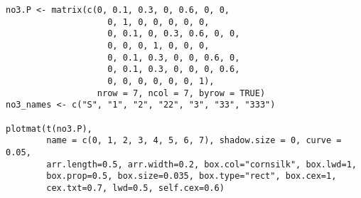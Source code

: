 \documentclass[answers]{exam}
\begin{document}
\begin{questions}
\begin{parts}
\begin{solution}
\begin{center}
                    \label{fig:markovchain_no3}
                \end{center}

                \end{solution}
                \begin{minipage}[t]{.9\textwidth}
                    \begin{lstlisting}[title=Code]
no3.P <- matrix(c(0, 0.1, 0.3, 0, 0.6, 0, 0,
                    0, 1, 0, 0, 0, 0, 0,
                    0, 0.1, 0, 0.3, 0.6, 0, 0,
                    0, 0, 0, 1, 0, 0, 0,
                    0, 0.1, 0.3, 0, 0, 0.6, 0,
                    0, 0.1, 0.3, 0, 0, 0, 0.6,
                    0, 0, 0, 0, 0, 0, 1),
                  nrow = 7, ncol = 7, byrow = TRUE)
no3_names <- c("S", "1", "2", "22", "3", "33", "333")

plotmat(t(no3.P),
        name = c(0, 1, 2, 3, 4, 5, 6, 7), shadow.size = 0, curve = 0.05,
        arr.length=0.5, arr.width=0.2, box.col="cornsilk", box.lwd=1, 
        box.prop=0.5, box.size=0.035, box.type="rect", box.cex=1, 
        cex.txt=0.7, lwd=0.5, self.cex=0.6)
                    \end{lstlisting}
                \end{minipage}
                \newline
                \begin{minipage}[t]{.9\textwidth}
                    \begin{lstlisting}[title=Output]

                    \end{lstlisting}
                \end{minipage}

\end{parts}
\end{questions}
\end{document}
